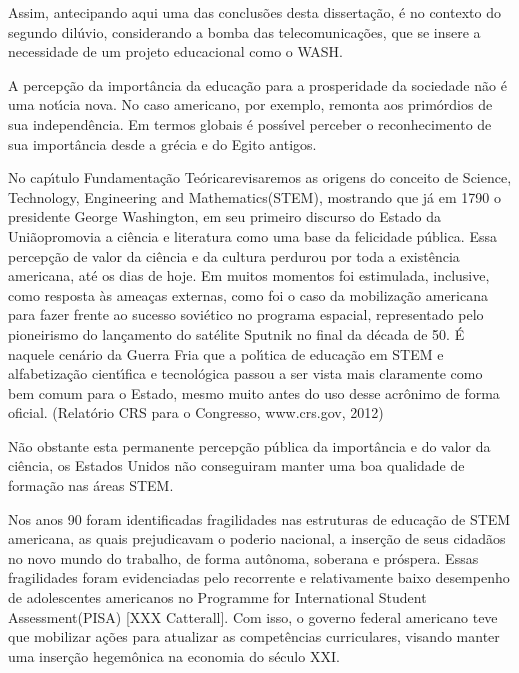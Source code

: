 \documentclass[
12pt,		%
openright,	%
twoside,  %
a4paper,			%
chapter=TITLE,		%
english,			%
french,				%
spanish,			%
brazil				%
]{USPSC-classe/USPSC}
\begin{document}
Assim, antecipando aqui uma das conclus\~oes desta disserta\c{c}\~ao, \'e no contexto do \textquotedbl segundo dil\'uvio\textquotedbl , considerando a bomba das telecomunica\c{c}\~oes, que se insere a necessidade de um projeto educacional como o WASH.


A percep\c{c}\~ao da import\^ancia da educa\c{c}\~ao para a prosperidade da sociedade n\~ao \'e uma not\'{\i}cia nova. No caso americano, por exemplo, remonta aos prim\'ordios de sua independ\^encia. Em termos globais \'e poss\'{\i}vel perceber o reconhecimento de sua import\^ancia desde a gr\'ecia e do Egito antigos.


No cap\'{\i}tulo \textquotedbl Fundamenta\c{c}\~ao Te\'orica\textquotedbl  revisaremos as origens do conceito de \textquotedbl Science, Technology, Engineering and Mathematics\textquotedbl  (STEM), mostrando que j\'a em 1790 o presidente George Washington, em seu primeiro discurso do \textquotedbl Estado da Uni\~ao\textquotedbl  promovia a ci\^encia e literatura como uma base da \textquotedbl felicidade p\'ublica\textquotedbl  [XXX]. Essa percep\c{c}\~ao de valor da ci\^encia e da cultura perdurou por toda a exist\^encia americana, at\'e os dias de hoje. Em muitos momentos foi estimulada, inclusive, como resposta \`as amea\c{c}as externas, como foi o caso da mobiliza\c{c}\~ao americana para fazer frente ao sucesso sovi\'etico no programa espacial, representado pelo pioneirismo do lan\c{c}amento do sat\'elite Sputnik no final da d\'ecada de 50. \'E naquele cen\'ario da Guerra Fria que a pol\'{\i}tica de educa\c{c}\~ao em STEM e alfabetiza\c{c}\~ao cient\'{\i}fica e tecnol\'ogica passou a ser vista mais claramente como bem comum para o Estado, mesmo muito antes do uso desse acr\^onimo de forma oficial. (Relat\'orio CRS para o Congresso, www.crs.gov, 2012)


N\~ao obstante esta permanente percep\c{c}\~ao p\'ublica da import\^ancia e do valor da ci\^encia, os Estados Unidos n\~ao conseguiram manter uma boa qualidade de forma\c{c}\~ao nas \'areas STEM.


Nos anos 90 foram identificadas fragilidades nas estruturas de educa\c{c}\~ao de STEM americana, as quais prejudicavam  o \textquotedbl poderio nacional\textquotedbl , a inser\c{c}\~ao de seus cidad\~aos no novo mundo do trabalho, de forma aut\^onoma, soberana  e pr\'ospera. Essas fragilidades foram evidenciadas pelo recorrente e relativamente baixo desempenho de adolescentes americanos no \textquotedbl Programme for International Student Assessment\textquotedbl  (PISA) [XXX Catterall]. Com isso, o governo federal americano teve que mobilizar a\c{c}\~oes para atualizar as compet\^encias curriculares, visando manter uma inser\c{c}\~ao hegem\^onica na economia do s\'eculo XXI.
\end{document}
